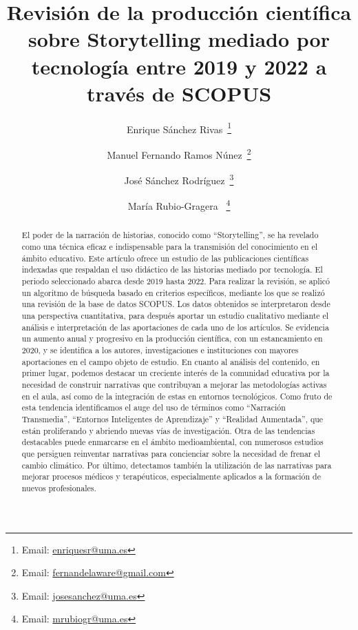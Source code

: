 \documentclass[spanish]{textolivre}
\title{Revisión de la producción científica sobre Storytelling mediado por tecnología entre 2019 y 2022 a través de SCOPUS}
\author[1]{Enrique Sánchez Rivas~\orcid{0000-0003-2518-2026}\thanks{Email: \href{mailto:enriquesr@uma.es}{enriquesr@uma.es}}}
\author[1]{Manuel Fernando Ramos Núnez~\orcid{0000-0002-5991-5454}\thanks{Email: \href{mailto:fernandelaware@gmail.com}{fernandelaware@gmail.com}}}
\author[1]{José Sánchez Rodríguez~\orcid{0000-0003-4525-8761}\thanks{Email: \href{mailto:josesanchez@uma.es}{josesanchez@uma.es}}}
\author[1]{María Rubio-Gragera ~\orcid{0000-0002-8311-8498}\thanks{Email: \href{mailto:jmrubiogr@uma.es}{mrubiogr@uma.es}}}
\affil[1]{Universidad de Málaga, Facultad de Ciencias de la Educación, Departamento de Didáctica y Organización Escolar, Málaga, España.}
\begin{document}
\maketitle
\begin{polyabstract}
\begin{abstract}
El poder de la narración de historias, conocido como “Storytelling”, se ha revelado como una técnica eficaz e indispensable para la transmisión del conocimiento en el ámbito educativo. Este artículo ofrece un estudio de las publicaciones científicas indexadas que respaldan el uso didáctico de las historias mediado por tecnología. El periodo seleccionado abarca desde 2019 hasta 2022. Para realizar la revisión, se aplicó un algoritmo de búsqueda basado en criterios específicos, mediante los que se realizó una revisión de la base de datos SCOPUS. Los datos obtenidos se interpretaron desde una perspectiva cuantitativa, para después aportar un estudio cualitativo mediante el análisis e interpretación de las aportaciones de cada uno de los artículos. Se evidencia un aumento anual y progresivo en la producción científica, con un estancamiento en 2020, y se identifica a los autores, investigaciones e instituciones con mayores aportaciones en el campo objeto de estudio. En cuanto al análisis del contenido, en primer lugar, podemos destacar un creciente interés de la comunidad educativa por la necesidad de construir narrativas que contribuyan a mejorar las metodologías activas en el aula, así como de la integración de estas en entornos tecnológicos. Como fruto de esta tendencia identificamos el auge del uso de términos como “Narración Transmedia”, “Entornos Inteligentes de Aprendizaje” y “Realidad Aumentada”, que están proliferando y abriendo nuevas vías de investigación. Otra de las tendencias destacables puede enmarcarse en el ámbito medioambiental, con numerosos estudios que persiguen reinventar narrativas para concienciar sobre la necesidad de frenar el cambio climático. Por último, detectamos también la utilización de las narrativas para mejorar procesos médicos y terapéuticos, especialmente aplicados a la formación de nuevos profesionales.

\end{abstract}


\end{polyabstract}
\end{document}
